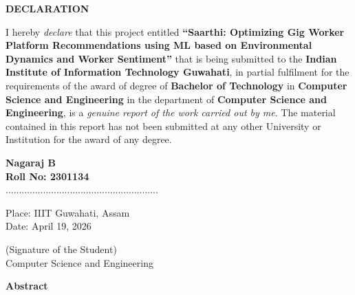 \documentclass[12pt,a4paper]{article}
\begin{document}
\newpage
\thispagestyle{empty}
\begin{center}
    \textbf{\Large DECLARATION}
\end{center}
\vspace{1cm}
I hereby \textit{declare} that this project entitled \textbf{``Saarthi: Optimizing Gig Worker Platform Recommendations using ML based on Environmental Dynamics and Worker Sentiment''} that is being submitted to the \textbf{Indian Institute of Information Technology Guwahati}, in partial fulfilment for the requirements of the award of degree of \textbf{Bachelor of Technology} in \textbf{Computer Science and Engineering} in the department of \textbf{Computer Science and Engineering}, is a \textit{genuine report of the work carried out by me}. The material contained in this report has not been submitted at any other University or Institution for the award of any degree.

\vspace{3cm}

\begin{flushright}
    \textbf{Nagaraj B} \\
    \textbf{Roll No: 2301134} \\
    \vspace{1cm}
    ......................................................... \\
\end{flushright}

\begin{flushleft}
    Place: IIIT Guwahati, Assam \\
    Date: April 19, 2026 \\
\end{flushleft}
\vspace{-1.5cm}
\begin{flushright}
    (Signature of the Student) \\
    Computer Science and Engineering
\end{flushright}


\newpage
{}
\begin{center}
    \textbf{\Large Abstract}
\end{center}
\vspace{1.5cm}
\end{document}
